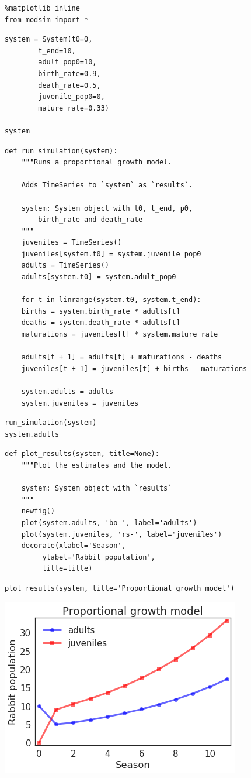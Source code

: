 \documentclass[11pt]{article}
\author{Kawin Nikomborirak}
\date{\today}
\title{}
\begin{document}
\tableofcontents

\begin{verbatim}
%matplotlib inline
from modsim import *
\end{verbatim}

\begin{verbatim}
system = System(t0=0,
		t_end=10,
		adult_pop0=10,
		birth_rate=0.9,
		death_rate=0.5,
		juvenile_pop0=0,
		mature_rate=0.33)

system
\end{verbatim}

\begin{verbatim}
def run_simulation(system):
    """Runs a proportional growth model.

    Adds TimeSeries to `system` as `results`.

    system: System object with t0, t_end, p0,
	    birth_rate and death_rate
    """
    juveniles = TimeSeries()
    juveniles[system.t0] = system.juvenile_pop0
    adults = TimeSeries()
    adults[system.t0] = system.adult_pop0

    for t in linrange(system.t0, system.t_end):
	births = system.birth_rate * adults[t]
	deaths = system.death_rate * adults[t]
	maturations = juveniles[t] * system.mature_rate

	adults[t + 1] = adults[t] + maturations - deaths
	juveniles[t + 1] = juveniles[t] + births - maturations

    system.adults = adults
    system.juveniles = juveniles
\end{verbatim}

\begin{verbatim}
run_simulation(system)
system.adults
\end{verbatim}

\begin{verbatim}
def plot_results(system, title=None):
    """Plot the estimates and the model.

    system: System object with `results`
    """
    newfig()
    plot(system.adults, 'bo-', label='adults')
    plot(system.juveniles, 'rs-', label='juveniles')
    decorate(xlabel='Season',
	     ylabel='Rabbit population',
	     title=title)
\end{verbatim}

\begin{verbatim}
plot_results(system, title='Proportional growth model')
\end{verbatim}

\begin{center}
\includegraphics[width=.9\linewidth]{rab2fig/rabs.png}
\end{center}
\end{document}
